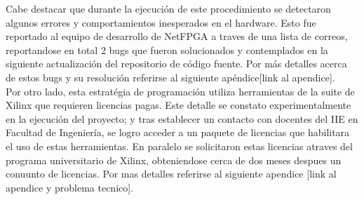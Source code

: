Cabe destacar que durante la ejecuci\'on de este procedimiento se detectaron algunos errores y comportamientos inesperados en el hardware. Esto fue reportado al equipo de desarrollo de NetFPGA a traves de una lista de correos, reportandose en total 2 bugs que fueron solucionados y contemplados en la siguiente actualizaci\'on del repositorio de c\'odigo fuente. Por m\'as detalles acerca de estos bugs y su resoluci\'on referirse al siguiente ap\'endice[link al apendice].\\

Por otro lado, esta estrat\'egia de programaci\'on utiliza herramientas de la suite de Xilinx que requieren licencias pagas. Este detalle se constato experimentalmente en la ejecuci\'on del proyecto; y tras establecer un contacto con docentes del IIE en Facultad de Ingenier\'ia, se logro acceder a un paquete de licencias que habilitara el uso de estas herramientas. En paralelo se solicitaron estas licencias atraves del programa universitario de Xilinx, obteniendose cerca de dos meses despues un conuunto de licencias. Por mas detalles referirse al siguiente apendice [link al apendice y problema tecnico].




